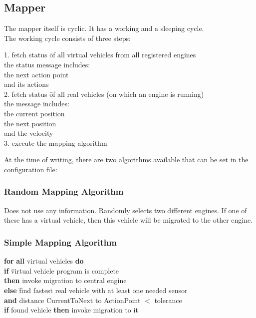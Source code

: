 \subsection{Mapper}
The mapper itself is cyclic. It has a working and a sleeping cycle. \\
The working cycle consists of three steps:
\begin{tabbing}
1. fetch status \= of all virtual vehicles from all registered engines \\
\>	the status message includes: \= \\ 
\> \>					the next action point \\ 
\> \>					and its actions \\[0.25cm]
2. fetch status \= of all real vehicles (on which an engine is running) \\
\>	the message includes:  \\
\> \>				the current position \\
\> \> 				the next position \\
\> \>				and the velocity \\[0.25cm]
3. execute the mapping algorithm \\
\end{tabbing}
At the time of writing, there are two algorithms available that can be set in the configuration file:
\subsubsection{Random Mapping Algorithm}
Does not use any information. Randomly selects two different engines. If one of these has a virtual vehicle, then this vehicle 
will be migrated to the other engine.

\subsubsection{Simple Mapping Algorithm}

	\begin{tabbing}
	\textbf{for} \= \textbf{all} virtual vehicles \textbf{do} \\[.25cm]
	\> \textbf{if}  \= virtual vehicle program is complete \\
	\> \>	\textbf{then} invoke migration to central engine \\[.25cm]
	\>	\textbf{else} \= find fastest real vehicle with at least one needed sensor \\
	\> \>	\textbf{and} distance CurrentToNext to ActionPoint \begin{math}< \end{math} tolerance \\[.25cm]
	\>	\textbf{if} found vehicle \textbf{then} invoke migration to it \\
	\end{tabbing}

